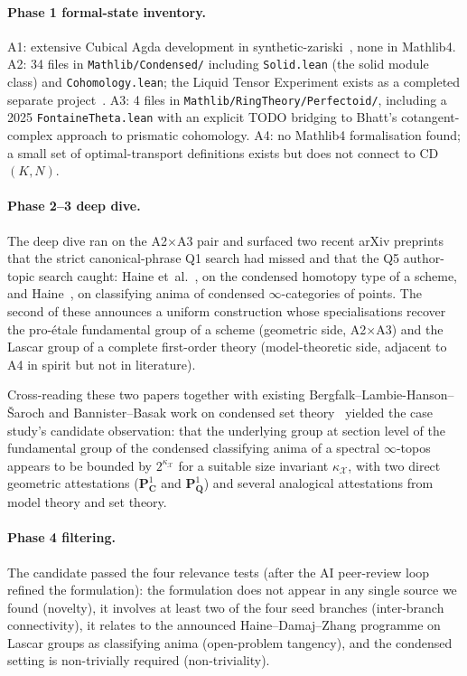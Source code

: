 \documentclass[11pt]{article}
\theoremstyle{definition}
\theoremstyle{remark}
\begin{document}
\paragraph{Phase 1 formal-state inventory.}
A1: extensive Cubical Agda development in
synthetic-zariski~\cite{SyntheticZariskiRepo}, none in Mathlib4.
A2: 34 files in \texttt{Mathlib/Condensed/} including
\texttt{Solid.lean} (the solid module class) and \texttt{Cohomology.lean};
the Liquid Tensor Experiment exists as a completed separate
project~\cite{LeanCommunity2022LTEFinal}.
A3: 4 files in \texttt{Mathlib/RingTheory/Perfectoid/}, including a
2025 \texttt{FontaineTheta.lean} with an explicit TODO bridging to
Bhatt's cotangent-complex approach to prismatic cohomology.
A4: no Mathlib4 formalisation found; a small set of
optimal-transport definitions exists but does not connect to
CD$(K,N)$.

\paragraph{Phase 2--3 deep dive.}
The deep dive ran on the A2$\times$A3 pair and surfaced two recent
arXiv preprints that the strict canonical-phrase Q1 search had missed
and that the Q5 author-topic search caught: Haine
et~al.~\cite{HHLMMW2025}, on the condensed homotopy type of a scheme,
and Haine~\cite{Haine2026classifying}, on classifying anima of
condensed $\infty$-categories of points. The second of these announces
a uniform construction whose specialisations recover the pro-\'etale
fundamental group of a scheme (geometric side, A2$\times$A3) and the
Lascar group of a complete first-order theory (model-theoretic side,
adjacent to A4 in spirit but not in literature).

Cross-reading these two papers together with existing
Bergfalk--Lambie-Hanson--\v{S}aroch and Bannister--Basak work on
condensed set theory~\cite{BLHS2023, BannisterBasak2026} yielded the
case study's candidate observation: that the underlying group at
section level of the fundamental group of the condensed classifying
anima of a spectral $\infty$-topos appears to be bounded by
$2^{\kappa_{\mathcal X}}$ for a suitable size invariant
$\kappa_{\mathcal X}$, with two direct geometric attestations
(\textbf{$\mathbf{P}^1_{\mathbf C}$} and \textbf{$\mathbf{P}^1_{\mathbf Q}$})
and several analogical attestations from model theory and set theory.

\paragraph{Phase 4 filtering.}
The candidate passed the four relevance tests (after the AI peer-review
loop refined the formulation): the formulation does not appear in any
single source we found (novelty), it involves at least two of the four
seed branches (inter-branch connectivity), it relates to the announced
Haine--Damaj--Zhang programme on Lascar groups as classifying anima
(open-problem tangency), and the condensed setting is non-trivially
required (non-triviality).
\end{document}
